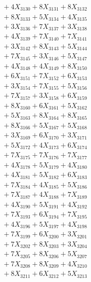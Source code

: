 \documentclass[a4paper,10pt]{article}
\begin{document}
{\begin{align}
&\;  + 4 X_{3130} + 8 X_{3131} + 8 X_{3132} \\[0.3ex]
&\;  + 8 X_{3133} + 5 X_{3134} + 4 X_{3135} \\[0.3ex]
&\;  + 3 X_{3136} + 7 X_{3137} + 3 X_{3138} \\[0.3ex]
&\;  + 4 X_{3139} + 7 X_{3140} + 7 X_{3141} \\[0.3ex]
&\;  + 3 X_{3142} + 8 X_{3143} + 5 X_{3144} \\[0.3ex]
&\;  + 7 X_{3145} + 3 X_{3146} + 5 X_{3147} \\[0.3ex]
&\;  + 4 X_{3148} + 4 X_{3149} + 8 X_{3150} \\[0.3ex]
&\;  + 6 X_{3151} + 7 X_{3152} + 6 X_{3153} \\[0.3ex]
&\;  + 3 X_{3154} + 7 X_{3155} + 5 X_{3156} \\[0.3ex]
&\;  + 7 X_{3157} + 3 X_{3158} + 6 X_{3159} \\[0.5ex]\allowbreak
&\;  + 8 X_{3160} + 6 X_{3161} + 5 X_{3162} \\[0.3ex]
&\;  + 5 X_{3163} + 8 X_{3164} + 8 X_{3165} \\[0.3ex]
&\;  + 8 X_{3166} + 5 X_{3167} + 5 X_{3168} \\[0.3ex]
&\;  + 3 X_{3169} + 6 X_{3170} + 3 X_{3171} \\[0.3ex]
&\;  + 5 X_{3172} + 4 X_{3173} + 6 X_{3174} \\[0.3ex]
&\;  + 7 X_{3175} + 7 X_{3176} + 7 X_{3177} \\[0.3ex]
&\;  + 4 X_{3178} + 5 X_{3179} + 4 X_{3180} \\[0.3ex]
&\;  + 4 X_{3181} + 5 X_{3182} + 6 X_{3183} \\[0.3ex]
&\;  + 7 X_{3184} + 4 X_{3185} + 5 X_{3186} \\[0.3ex]
&\;  + 7 X_{3187} + 4 X_{3188} + 7 X_{3189} \\[0.5ex]\allowbreak
&\;  + 4 X_{3190} + 5 X_{3191} + 4 X_{3192} \\[0.3ex]
&\;  + 7 X_{3193} + 6 X_{3194} + 7 X_{3195} \\[0.3ex]
&\;  + 4 X_{3196} + 5 X_{3197} + 4 X_{3198} \\[0.3ex]
&\;  + 7 X_{3199} + 6 X_{3200} + 3 X_{3201} \\[0.3ex]
&\;  + 7 X_{3202} + 8 X_{3203} + 3 X_{3204} \\[0.3ex]
&\;  + 7 X_{3205} + 8 X_{3206} + 5 X_{3207} \\[0.3ex]
&\;  + 7 X_{3208} + 8 X_{3209} + 4 X_{3210} \\[0.3ex]
&\;  + 8 X_{3211} + 6 X_{3212} + 5 X_{3213} \\[0.3ex]

\end{align}}
\end{document}
